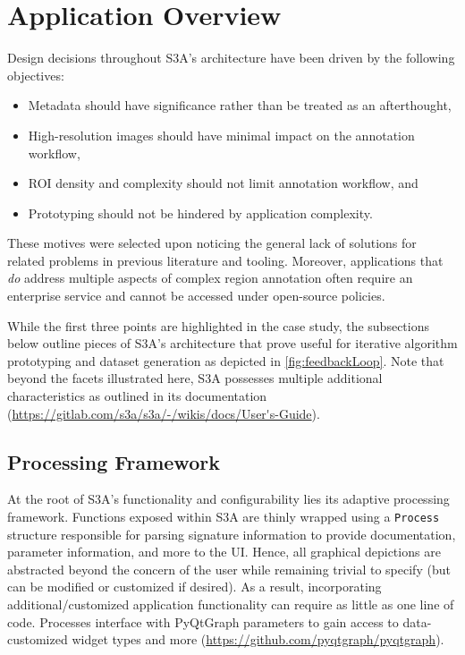 \section{Application Overview}\label{sec:appFeatures}
Design decisions throughout S3A's architecture have been driven by the following objectives:

\begin{itemize}
\item Metadata should have significance rather than be treated as an afterthought,
\item High-resolution images should have minimal impact on the annotation workflow,
\item ROI density and complexity should not limit annotation workflow, and
\item Prototyping should not be hindered by application complexity.
\end{itemize}

These motives were selected upon noticing the general lack of solutions for related problems in previous literature and tooling.
Moreover, applications that \emph{do} address multiple aspects of complex region annotation often require an enterprise service and cannot be accessed under open-source policies.

While the first three points are highlighted in the case study, the subsections below outline pieces of S3A's architecture that prove useful for iterative algorithm prototyping and dataset generation as depicted in \autoref{fig:feedbackLoop}.
Note that beyond the facets illustrated here, S3A possesses multiple additional characteristics as outlined in its documentation (\url{https://gitlab.com/s3a/s3a/-/wikis/docs/User's-Guide}).

\makeFeedbackLoopFig

\subsection{Processing Framework}\label{sec:procFramework}
At the root of S3A's functionality and configurability lies its adaptive processing framework.
Functions exposed within S3A are thinly wrapped using a \texttt{Process} structure responsible for parsing signature information to provide documentation, parameter information, and more to the UI.
Hence, all graphical depictions are abstracted beyond the concern of the user while remaining trivial to specify (but can be modified or customized if desired).
As a result, incorporating additional/customized application functionality can require as little as one line of code.
Processes interface with PyQtGraph parameters to gain access to data-customized widget types and more (\url{https://github.com/pyqtgraph/pyqtgraph}).

